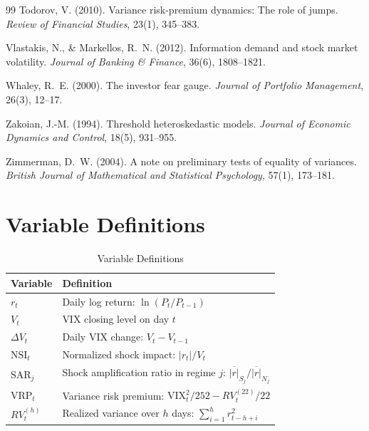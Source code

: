\documentclass[12pt,a4paper]{article}
\begin{document}
\begin{thebibliography}{99}
Todorov, V. (2010). Variance risk-premium dynamics: The role of jumps. \textit{Review of Financial Studies}, 23(1), 345--383.

Vlastakis, N., \& Markellos, R.~N. (2012). Information demand and stock market volatility. \textit{Journal of Banking \& Finance}, 36(6), 1808--1821.

Whaley, R.~E. (2000). The investor fear gauge. \textit{Journal of Portfolio Management}, 26(3), 12--17.

Zakoian, J.-M. (1994). Threshold heteroskedastic models. \textit{Journal of Economic Dynamics and Control}, 18(5), 931--955.

Zimmerman, D.~W. (2004). A note on preliminary tests of equality of variances. \textit{British Journal of Mathematical and Statistical Psychology}, 57(1), 173--181.

\end{thebibliography}


\newpage
\appendix
\section{Variable Definitions}
\label{app:variables}

\begin{table}[H]
\centering
\caption{Variable Definitions}
\label{tab:variables}
\begin{tabular}{lp{10cm}}
\toprule
Variable & Definition \\
\midrule
$r_t$ & Daily log return: $\ln(P_t / P_{t-1})$ \\
$V_t$ & VIX closing level on day $t$ \\
$\Delta V_t$ & Daily VIX change: $V_t - V_{t-1}$ \\
$\text{NSI}_t$ & Normalized shock impact: $|r_t| / V_t$ \\
$\text{SAR}_j$ & Shock amplification ratio in regime $j$: $\overline{|r|}_{S_j} / \overline{|r|}_{N_j}$ \\
$\text{VRP}_t$ & Variance risk premium: $\text{VIX}_t^2 / 252 - RV_t^{(22)} / 22$ \\
$RV_t^{(h)}$ & Realized variance over $h$ days: $\sum_{i=1}^{h} r_{t-h+i}^2$ \\
\bottomrule
\end{tabular}
\end{table}
\end{document}
